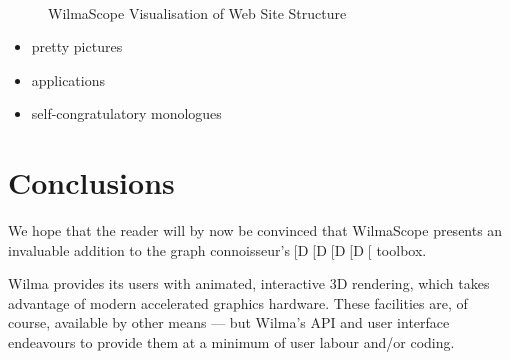 \documentclass[runningheads]{cl2emult}
\begin{document}
\begin{figure}
\begin{center}
 \\
\caption{{\sc WilmaScope Visualisation of Web Site Structure}}
\label{fig-web}
\end{center}
\end{figure}

\begin{itemize}
\item pretty pictures
\item applications
\item self-congratulatory monologues
\end{itemize}

\section{Conclusions}
\label{sec:conclusions}

We hope that the reader will by now be convinced that WilmaScope presents an
invaluable addition to the graph connoisseur's[D[D[D[D[ toolbox.  

Wilma provides its users with animated, interactive 3D rendering, which takes
advantage of modern accelerated graphics hardware.  These facilities are, of
course, available by other means --- but Wilma's API and user interface
endeavours to provide them at a minimum of user labour and/or coding.
\end{document}
